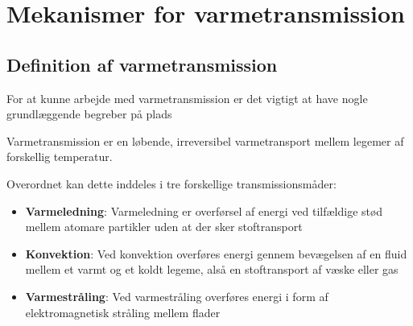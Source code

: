 
\section{Mekanismer for varmetransmission}

\subsection{Definition af varmetransmission}
For at kunne arbejde med varmetransmission er det vigtigt at have nogle grundlæggende begreber på plads

\begin{definition}[Varmetransmission]
  Varmetransmission er en løbende, irreversibel varmetransport mellem legemer af forskellig temperatur.
\end{definition}

Overordnet kan dette inddeles i tre forskellige transmissionsmåder:
\begin{itemize}
  \item \textbf{Varmeledning}: Varmeledning er overførsel af energi ved tilfældige stød mellem atomare partikler uden at der sker stoftransport
  \item \textbf{Konvektion}: Ved konvektion overføres energi gennem bevægelsen af en fluid mellem et varmt og et koldt legeme, alså en stoftransport af væske eller gas
  \item \textbf{Varmestråling}: Ved varmestråling overføres energi i form af elektromagnetisk stråling mellem flader
\end{itemize}


